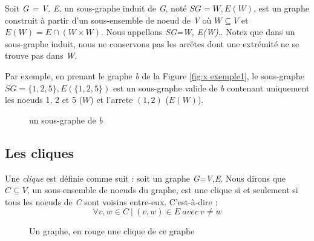 \documentclass[12pt,a4paper]{article}
\begin{document}
Soit \emph{G = V, E}, un sous-graphe induit de \emph{G}, noté \(SG = W, E(W)\), est un graphe construit à partir d'un sous-ensemble de noeud de \emph{V} où $ W \subseteq V $ et $ E(W) = E \cap (W \times W) $. Nous appellons \emph{SG=W, E(W)}..
Notez que dans un sous-graphe induit, nous ne conservons pas les arrêtes dont une extrémité ne se trouve pas dans \emph{W}.

Par exemple, en prenant le graphe \textit{b} de la Figure \ref{fig:x exemple1}, le sous-graphe \(SG=\{1, 2, 5\}, E(\{1, 2, 5\})\) est un sous-graphe valide de \textit{b} contenant uniquement les noeuds 1, 2 et 5 (\(W\)) et l'arrete \((1,2)\) (\(E(W)\)).

\begin{figure}
  \centering
  \caption{un sous-graphe de \textit{b}}
\end{figure}

\subsection{Les cliques}%
\label{subsec:cliques}

Une \textit{clique} est définie comme suit :
soit un graphe \emph{G=V,E}. Nous dirons que \(C \subseteq V\), un sous-ensemble de noeuds du graphe, est une clique si et seulement si tous les noeuds de \emph{C} sont voisins entre-eux.
C'est-à-dire :
\begin{equation}\label{clique}
\forall v, w \in C \ | \ (v, w)\in E \ avec\  v \neq w
\end{equation}

\begin{figure}[h]
  \centering
  \caption{Un graphe, en rouge une clique de ce graphe}
  \label{fig:x clique1}
\end{figure}
\end{document}
